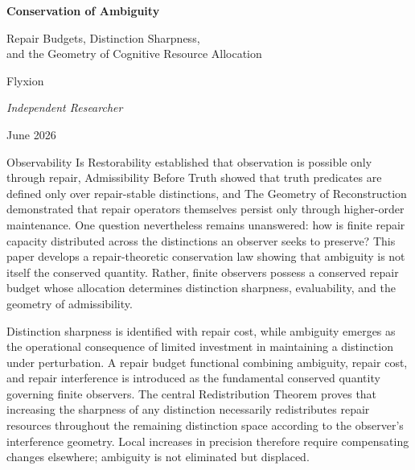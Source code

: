 \documentclass[12pt,oneside]{article}
\theoremstyle{plain}
\theoremstyle{definition}
\theoremstyle{remark}
\begin{document}

\begin{center}

{\LARGE\bfseries
Conservation of Ambiguity}

\vspace{0.9em}

{\large
Repair Budgets, Distinction Sharpness,\\
and the Geometry of Cognitive Resource Allocation}

\vspace{1.5em}

{\normalsize
Flyxion}

\vspace{0.3em}

{\small\itshape
Independent Researcher}

\vspace{1.6em}

{\small
June 2026}

\end{center}

\vspace{0.5em}

\abstract

Observability Is Restorability established that observation is possible only through repair, Admissibility Before Truth showed that truth predicates are defined only over repair-stable distinctions, and The Geometry of Reconstruction demonstrated that repair operators themselves persist only through higher-order maintenance. One question nevertheless remains unanswered: how is finite repair capacity distributed across the distinctions an observer seeks to preserve? This paper develops a repair-theoretic conservation law showing that ambiguity is not itself the conserved quantity. Rather, finite observers possess a conserved repair budget whose allocation determines distinction sharpness, evaluability, and the geometry of admissibility.

Distinction sharpness is identified with repair cost, while ambiguity emerges as the operational consequence of limited investment in maintaining a distinction under perturbation. A repair budget functional combining ambiguity, repair cost, and repair interference is introduced as the fundamental conserved quantity governing finite observers. The central Redistribution Theorem proves that increasing the sharpness of any distinction necessarily redistributes repair resources throughout the remaining distinction space according to the observer's interference geometry. Local increases in precision therefore require compensating changes elsewhere; ambiguity is not eliminated but displaced.
\end{document}
